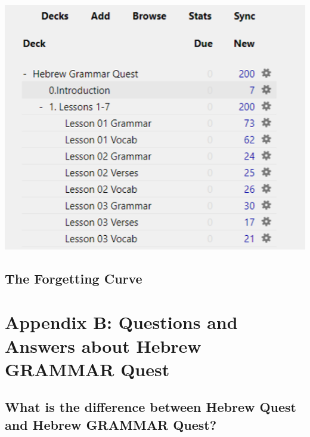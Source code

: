 \documentclass[
]{turabian-researchpaper}
\begin{document}
\includegraphics{images/Anki_home_screen.png}

\hypertarget{the-forgetting-curve}{%
\subsection{The Forgetting Curve}\label{the-forgetting-curve}}

\hypertarget{faq}{%
\section*{Appendix B: Questions and Answers about Hebrew GRAMMAR Quest}\label{faq}}

\hypertarget{difference}{%
\subsection*{What is the difference between Hebrew Quest and Hebrew GRAMMAR Quest?}\label{difference}}
\end{document}

